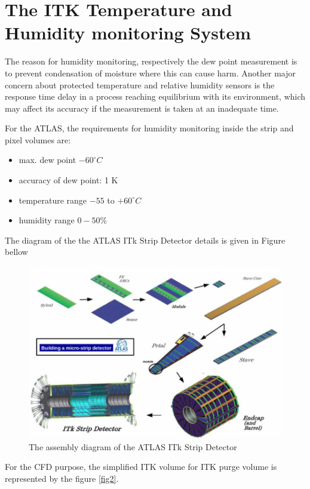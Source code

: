 \documentclass[a4paper]{jpconf}
\begin{document}
\section{The ITK Temperature and Humidity monitoring System}

The reason for humidity monitoring, respectively the dew point measurement is to prevent condensation of
moisture where this can cause harm.  Another major concern about protected temperature and relative humidity
sensors is the response time delay in a process reaching equilibrium with its environment, which may affect its accuracy if the measurement is taken at an inadequate time.

For the ATLAS, the requirements for humidity monitoring inside the strip and pixel volumes are:

\begin{itemize}
	\item max. dew point $ - 60 ^{\circ} C$ 
	\item accuracy of dew point: 1 K
	\item temperature range $ - 55$ to $ + 60 ^{\circ} C$
	\item humidity range $0 - 50 \%$
\end{itemize}
The diagram of the the ATLAS ITk Strip Detector details is given in Figure \cite{fig:ITKdet} bellow 
\begin{figure}[!h]
\begin{center}
  \includegraphics[width=0.75\linewidth]{PictureITKstrip.png}
  \caption{The assembly diagram of the ATLAS ITk Strip Detector \cite{8}
}
  \label{fig:ITKdet}
	\end{center}
\end{figure}

For the CFD purpose, the simplified ITK volume for ITK purge volume is represented by the figure \ref{fig2}.
\end{document}
